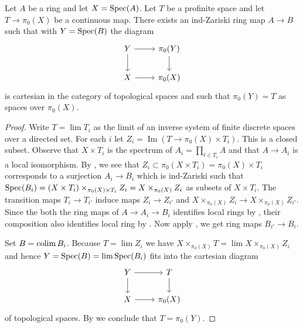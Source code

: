 \begin{lemma}
  Let $A$ be a ring and let $X = \operatorname{Spec} (A)$. Let $T$ be a profinite space and let $T \to \pi_0(X)$ be a continuous map. There exists an ind-Zariski ring map $A \to B$ such that with $Y = \operatorname{Spec} (B)$ the diagram
  \[
  \begin{tikzcd}
  Y \arrow[r] \arrow[d] & \pi_0(Y) \arrow[d] \\
  X \arrow[r] & \pi_0(X)
  \end{tikzcd}
  \]
  is cartesian in the category of topological spaces and such that $\pi_0(Y) = T$ as spaces over $\pi_0(X)$.
  \label{thm:exists-ind-Zariski-cartesian}
\end{lemma}

\begin{proof}
  Write $T = \lim T_i$ as the limit of an inverse system of finite discrete spaces over a directed set. For each $i$ let $Z_i = \operatorname{Im} (T \to \pi_0(X) \times T_i)$. This is a closed subset. Observe that $X \times T_i$ is the spectrum of $A_i = \prod_{t \in T_i} A$ and that $A \to A_i$ is a local isomorphism. By , we see that $Z_i \subset \pi_0(X \times T_i) = \pi_0(X) \times T_i$ corresponds to a surjection $A_i \to B_i$ which is ind-Zariski such that $\operatorname{Spec} (B_i) = (X \times T_i) \times_{\pi_0(X) \times T_i} Z_i = X \times_{\pi_0(X)} Z_i$ as subsets of $X \times T_i$. The transition maps $T_i \to T_{i'}$ induce maps $Z_i \to Z_{i'}$ and $X \times_{\pi_0(X)} Z_i \to X \times_{\pi_0(X)} Z_{i'}$. Since the both the ring maps of \(A \to A_{i} \to B_{i}\) identifies local rings by , their composition also identifies local ring by . Now apply , we
  get ring maps $B_{i'} \to B_i$. 

  Set $B = \operatorname{colim} B_i$. Because $T = \lim Z_i$ we have $X \times_{\pi_0(X)} T = \lim X \times_{\pi_0(X)} Z_i$ and hence $Y = \operatorname{Spec} (B) = \lim \operatorname{Spec} (B_i)$ fits into the cartesian diagram
  \[
  \begin{tikzcd}
  Y \arrow[r] \arrow[d] & T \arrow[d] \\
  X \arrow[r] & \pi_0(X)
  \end{tikzcd}
  \]
  of topological spaces. By  we conclude that $T = \pi_0(Y)$.
\end{proof}

